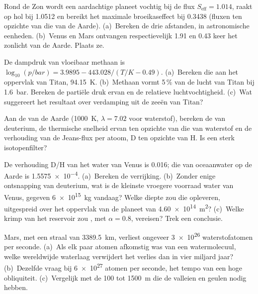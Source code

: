\begin{exercise}[$\star$]\label{exo:b3:planetary-atmospheres:3}
Rond de Zon wordt een aardachtige planeet vochtig bij de flux $S_\mathrm{eff}
= 1.014$, raakt op hol bij 1.0512 en bereikt het maximale broeikaseffect bij 0.3438
(fluxen ten opzichte van die van de Aarde). (a)~Bereken de drie afstanden, in
astronomische eenheden. (b)~Venus en Mars ontvangen respectievelijk 1.91 en 0.43 keer
het zonlicht van de Aarde. Plaats ze.
\end{exercise}

\begin{exercise}[$\star$]\label{exo:b3:planetary-atmospheres:4}
De dampdruk van vloeibaar methaan is $\log_{10}(p/\unit{bar}) = 3.9895 -
443.028/(T/\unit{K} - 0.49)$. (a)~Bereken die aan het oppervlak van Titan,
\qty{94.15}{K}. (b)~Methaan vormt 5\,\% van de lucht van Titan bij \qty{1.6}{bar}.
Bereken de partiële druk ervan en de relatieve luchtvochtigheid. (c)~Wat suggereert
het resultaat over verdamping uit de zeeën van Titan?
\end{exercise}

\begin{exercise}[$\star\star$]\label{exo:b3:planetary-atmospheres:5}
Aan de  van de Aarde (\qty{1000}{K}, $\lambda = 7.02$ voor waterstof),
bereken de  van deuterium, de thermische snelheid ervan ten opzichte van
die van waterstof en de verhouding van de Jeans-flux per atoom, D ten opzichte van H. Is
 een sterk isotopenfilter?
\end{exercise}

\begin{exercise}[$\star\star$]\label{exo:b3:planetary-atmospheres:6}
De verhouding D/H van het water van Venus is \num{0.016}; die van oceaanwater op
de Aarde is \num{1.5575e-4}. (a)~Bereken de verrijking. (b)~Zonder enige
ontsnapping van deuterium, wat is de kleinste vroegere voorraad water
van Venus, gegeven \qty{6e15}{kg} vandaag? Welke diepte zou die opleveren, uitgespreid over
het oppervlak van de planeet van \qty{4.60e14}{m^2}? (c)~Welke krimp van het reservoir zou
, met $\alpha = 0.8$, vereisen? Trek een conclusie.
\end{exercise}

\begin{exercise}[$\star\star$]\label{exo:b3:planetary-atmospheres:7}
Mars, met een straal van \qty{3389.5}{km}, verliest ongeveer \num{3e26} waterstofatomen
per seconde. (a)~Als elk paar atomen afkomstig was van een watermolecuul, welke
wereldwijde waterlaag verwijdert het verlies dan in vier miljard jaar?
(b)~Dezelfde vraag bij \num{6e27} atomen per seconde, het tempo van een hoge
obliquiteit. (c)~Vergelijk met de 100 tot \qty{1500}{m} die de valleien en
geulen nodig hebben.
\end{exercise}

